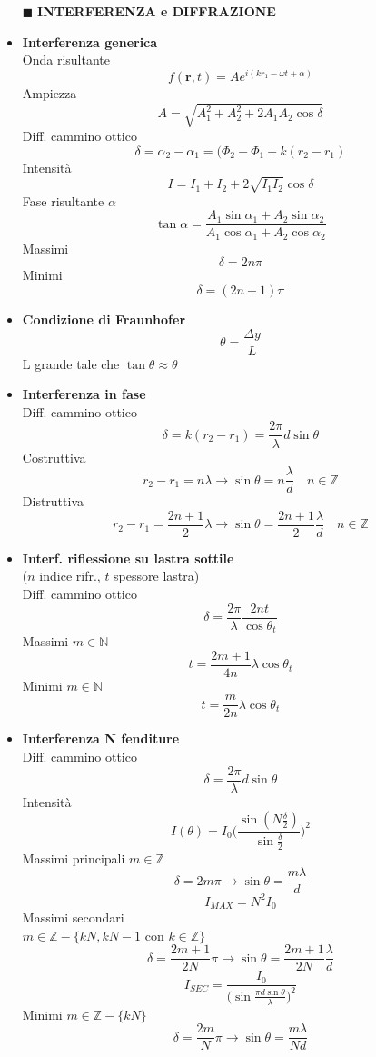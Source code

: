 \documentclass{book}
\newcommand{\g}{\textbf}
\newcommand{\h}{\mathbf}
\newcommand{\e}{\begin{equation}}
\newcommand{\ex}{\end{equation} }
\renewcommand{\it}{\item[$\cdot$]}
\begin{document}
\begin{multicols}{4}
\begin{itemize}
\hline
\item [$\blacksquare$] \g{INTERFERENZA e DIFFRAZIONE}  
    \it \g{Interferenza generica} \\
        Onda risultante
        \e{f(\h{r},t)=Ae^{i(kr_1-\omega t+\alpha)}} \ex
        Ampiezza
        \e{A=\sqrt{A_1^2+A_2^2+2A_1A_2\cos\delta}} \ex
        Diff. cammino ottico
        \e{\delta=\alpha_2-\alpha_1=(\Phi_2-\Phi_1+k(r_2-r_1)} \ex
        Intensità
        \e{I=I_1+I_2+2\sqrt{I_1I_2}\cos{\delta}} \ex
        Fase risultante $\alpha$
        \e{\tan\alpha=\frac{A_1\sin{\alpha_1}+A_2\sin{\alpha_2}}{A_1\cos{\alpha_1}+A_2\cos{\alpha_2}}} \ex
        Massimi
        \e{\delta=2n\pi} \ex
        Minimi
        \e{\delta=(2n+1)\pi } \ex
    \it \g{Condizione di Fraunhofer} \\
        \e{\theta=\frac{\Delta y}{L}} \ex
        L grande tale che $\tan\theta\approx\theta$     
    \it \g{Interferenza in fase} \\
        Diff. cammino ottico
        \e{\delta=k(r_2-r_1)=\frac{2\pi}{\lambda}d\sin{\theta}} \ex
        Costruttiva
        \e{r_2-r_1=n\lambda \rightarrow \sin{\theta}=n\frac{\lambda}{d} \quad n\in\mathbb{Z}} \ex
        Distruttiva
        \e{r_2-r_1=\frac{2n+1}{2}\lambda \rightarrow \sin{\theta}=\frac{2n+1}{2}\frac{\lambda}{d} \quad n\in\mathbb{Z}} \ex
    \it \g{Interf. riflessione su lastra sottile} \\
        ($n$ indice rifr., $t$ spessore lastra) \\
        Diff. cammino ottico
        \e{\delta=\frac{2\pi}{\lambda}\frac{2nt}{\cos\theta_t}} \ex
        Massimi $m\in\mathbb{N}$
        \e{t=\frac{2m+1}{4n}\lambda\cos\theta_t}\ex
        Minimi $m\in\mathbb{N}$
        \e{t=\frac{m}{2n}\lambda\cos\theta_t}\ex
    \it \g{Interferenza N fenditure} \\
        Diff. cammino ottico
        \e{\delta=\frac{2\pi}{\lambda}d\sin{\theta}} \ex
        Intensità
        \e{I(\theta)=I_0\biggl(\frac{\sin(N\frac{\delta}{2})}{\sin\frac{\delta}{2}}\biggr)^2} \ex
        Massimi principali $m\in\mathbb{Z}$
        \e{\delta=2m\pi \rightarrow \sin\theta=\frac{m\lambda}{d}} \ex
        \e{I_{MAX}=N^2I_0} \ex
        Massimi secondari \\
        $m\in\mathbb{Z}-\{kN,kN-1$ con $k\in\mathbb{Z}\}$
        \e{\delta=\frac{2m+1}{2N}\pi \rightarrow \sin\theta=\frac{2m+1}{2N}\frac{\lambda}{d}} \ex
        \e{I_{SEC}=\frac{I_0}{\bigl(\sin\frac{\pi d \sin\theta}{\lambda} \bigr)^2}} \ex
        Minimi $m\in\mathbb{Z}-\{kN\}$
        \e{\delta=\frac{2m}{N}\pi \rightarrow \sin\theta=\frac{m\lambda}{Nd}} \ex

\end{itemize}
\end{multicols}
\end{document}
